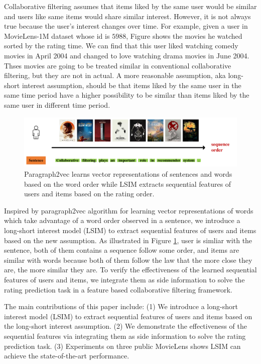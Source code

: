 \documentclass{sig-alternate-05-2015}
\begin{document}
Collaborative filtering assumes that items liked by the same user would be similar and
users like same items would share similar interest.
However, it is not always true because the user's interest changes over time.
For example, given a user in MovieLens-1M dataset whose id is $5988$,
Figure \label{fig:example} shows the movies he watched sorted by the rating time.
We can find that this user liked watching comedy movies in April 2004 and
changed to love watching drama movies in June 2004.
Thses movies are going to be treated similar in conventional collaborative filtering,
but they are not in actual.
A more reasonable assumption, aka long-short interest assumption, should be that
items liked by the same user in the same time period have a higher possibility
to be similar than items liked by the same user in different time period.

\begin{figure}[htbp]
    \centering
    \includegraphics[scale=0.38]{images/example2.pdf}
    \caption{Paragraph2vec learns vector representations of sentences and words
    based on the word order
    while LSIM extracts sequential features of users and items
    based on the rating order.
    }
    \label{fig:example2}
\end{figure}

Inspired by paragraph2vec algorithm \cite{le2014distributed} for
learning vector representations of words which take advantage of
a word order observed in a sentence,
we introduce a long-short interest model (LSIM) to extract sequential features
of users and items based on the new assumption.
As illustrated in Figure \ref{fig:example2}, user is simliar with the sentence,
both of them contains a sequence follow some order,
and items are similar with words because both of them follow the law
that the more close they are, the more similar they are.
To verify the effectiveness of the learned sequential features of users
and items, we integrate them as side information to solve the rating prediction task
in a feature based collaborative filtering framework.

The main contributions of this paper include:
(1) We introduce a long-short interest model (LSIM) to extract sequential features
of users and items based on the long-short interest assumption.
(2) We demonstrate the effectiveness of the sequential features
via integrating them as side information to solve the rating prediction task.
(3) Experiments on three public MovieLens shows LSIM can achieve the state-of-the-art performance.
\end{document}
